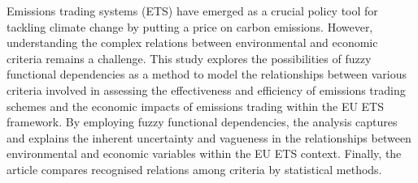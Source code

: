 
\begin{Abstrakt}
    Emissions trading systems (ETS) have emerged as a crucial policy tool for tackling climate change by putting a price on carbon emissions. However, understanding the complex relations between environmental and economic criteria remains a challenge. This study explores the possibilities of fuzzy functional dependencies as a method to model the relationships between various criteria involved in assessing the effectiveness and efficiency of emissions trading schemes and the economic impacts of emissions trading within the EU ETS framework. By employing fuzzy functional dependencies, the analysis captures and explains the inherent uncertainty and vagueness in the relationships between environmental and economic variables within the EU ETS context. Finally, the article compares recognised relations among criteria by statistical methods.
\end{Abstrakt}



\clearpage